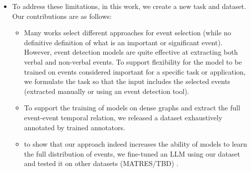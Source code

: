 \begin{itemize}
\begin{itemize}
    \end{itemize}
    \item To address these limitations, in this work, we create a new task and dataset. Our contributions are as follows:
    \begin{itemize}
        \item Many works select different approaches for event selection (while no definitive definition of what is an important or significant event). However, event detection models are quite effective at extracting both verbal and non-verbal events. To support flexibility for the model to be trained on events considered important for a specific task or application, we formulate the task so that the input includes the selected events (extracted manually or using an event detection tool).
        \item To support the training of models on dense graphs and extract the full event-event temporal relation, we released a dataset exhaustively annotated by trained annotators.
        \item {} to show that our approach indeed increases the ability of models to learn the full distribution of events, we fine-tuned an LLM using our dataset and tested it on other datasets (MATRES/TBD) .
    \end{itemize}
\end{itemize}
